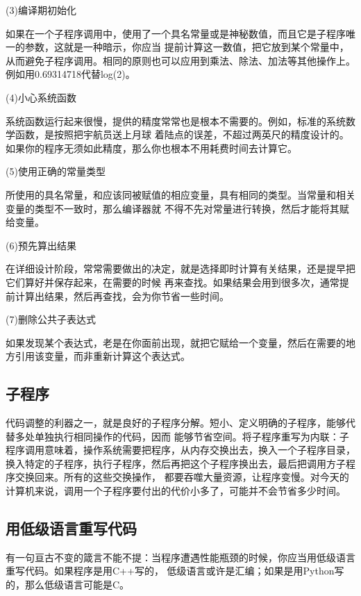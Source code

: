 \documentclass{article}
\begin{document}
\par
(3)编译期初始化
\par
如果在一个子程序调用中，使用了一个具名常量或是神秘数值，而且它是子程序唯一的参数，这就是一种暗示，你应当
提前计算这一数值，把它放到某个常量中，从而避免子程序调用。相同的原则也可以应用到乘法、除法、加法等其他操作上。
例如用0.69314718代替log(2)。

\par
(4)小心系统函数
\par
系统函数运行起来很慢，提供的精度常常也是根本不需要的。例如，标准的系统数学函数，是按照把宇航员送上月球
着陆点的误差，不超过两英尺的精度设计的。如果你的程序无须如此精度，那么你也根本不用耗费时间去计算它。

\par
(5)使用正确的常量类型
\par
所使用的具名常量，和应该同被赋值的相应变量，具有相同的类型。当常量和相关变量的类型不一致时，那么编译器就
不得不先对常量进行转换，然后才能将其赋给变量。

\par
(6)预先算出结果
\par
在详细设计阶段，常常需要做出的决定，就是选择即时计算有关结果，还是提早把它们算好并保存起来，在需要的时候
再来查找。如果结果会用到很多次，通常提前计算出结果，然后再查找，会为你节省一些时间。

\par
(7)删除公共子表达式
\par
如果发现某个表达式，老是在你面前出现，就把它赋给一个变量，然后在需要的地方引用该变量，而非重新计算这个表达式。

\subsection{子程序}
代码调整的利器之一，就是良好的子程序分解。短小、定义明确的子程序，能够代替多处单独执行相同操作的代码，因而
能够节省空间。将子程序重写为内联：子程序调用意味着，操作系统需要把程序，从内存交换出去，换入一个子程序目录，
换入特定的子程序，执行子程序，然后再把这个子程序换出去，最后把调用方子程序交换回来。所有的这些交换操作，
都要吞噬大量资源，让程序变慢。对今天的计算机来说，调用一个子程序要付出的代价小多了，可能并不会节省多少时间。

\subsection{用低级语言重写代码}
有一句亘古不变的箴言不能不提：当程序遭遇性能瓶颈的时候，你应当用低级语言重写代码。如果程序是用C++写的，
低级语言或许是汇编；如果是用Python写的，那么低级语言可能是C。
\end{document}
